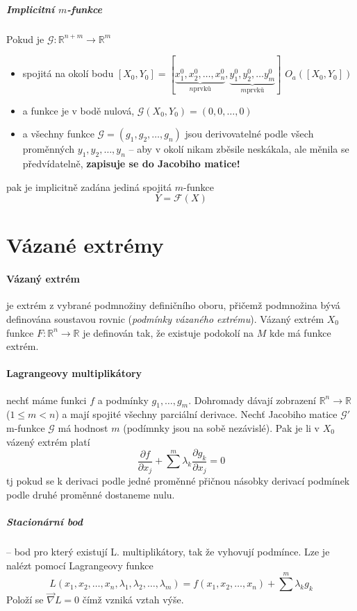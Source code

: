 \documentclass[a4paper, twoside,%
12pt]{article}
\newcommand{\R}{\mathbb{R}}
\newcommand{\pard}[2]{\frac{\partial #1 }{\partial #2 }}
\newcommand{\F}{\mathscr{F}}
\newcommand{\G}{\mathscr{G}}
\begin{document}
\subparagraph{Implicitní $m$-funkce} Pokud je $\G: \R^{n+m}\to \R^m $ 
\begin{itemize}
    \item spojitá na okolí bodu $\left[X_0, Y_0\right] = \left[\underbrace{x^0_1, x^0_2 , \dots, x^0_n}_{n \text{prvků}}, \underbrace{y^0_1, y^0_2, \dots y^0_m}_{m \text{prvků}}\right]$ $O_a ([X_0, Y_0 ])$
    \item a funkce je v bodě nulová, $\G (X_0, Y_0)=(0, 0, \dots, 0)$
    \item a všechny funkce $\G = (g_1, g_2, \dots, g_n)$ jsou derivovatelné podle všech proměnných $y_1, y_2, \dots, y_n$ -- \textsf{aby v okolí nikam zběsile neskákala, ale měnila se předvídatelně, \textbf{zapisuje se do Jacobiho matice!}}
\end{itemize}
pak je implicitně zadána jediná spojitá $m$-funkce 
$$ Y = \F(X) $$

\section{Vázané extrémy}
\paragraph{Vázaný extrém} je extrém z vybrané podmnožiny definičního oboru, přičemž podmnožina bývá definována soustavou rovnic (\emph{podmínky vázaného extrému}). Vázaný extrém $X_0$ funkce $F: \R^n \to \R$ je definován tak, že existuje podokolí na $M$ kde má funkce extrém.

\paragraph{Lagrangeovy multiplikátory} nechť máme funkci $f$ a podmínky $g_1, \dots, g_m$. Dohromady dávají zobrazení $\R^n \to \R$ ($1\leq m<n$) a mají spojité všechny parciální derivace. Nechť Jacobiho matice $\G'$ m-funkce $\G$ má hodnost $m$ (podímnky jsou na sobě nezávislé). Pak je li v $X_0$ vázený extrém platí
$$\pard{f}{x_j} + \sum^{m} \lambda_k \pard{g_k}{x_j} = 0 $$
\textsf{tj pokud se k derivaci podle jedné proměnné přičnou násobky derivací podmínek podle druhé proměnné dostaneme nulu}.

\subparagraph{Stacionární bod} -- bod pro který existují L. multiplikátory, tak že vyhovují podmínce.
Lze je nalézt pomocí Lagrangeovy funkce 
$$ L(x_1, x_2, \dots, x_n, \lambda_1, \lambda_2, \dots, \lambda_m) = f(x_1, x_2, \dots, x_n) + \sum^{m} \lambda_k g_k $$
Položí se $\vec\nabla L = 0$ čímž vzniká vztah výše.
\end{document}
